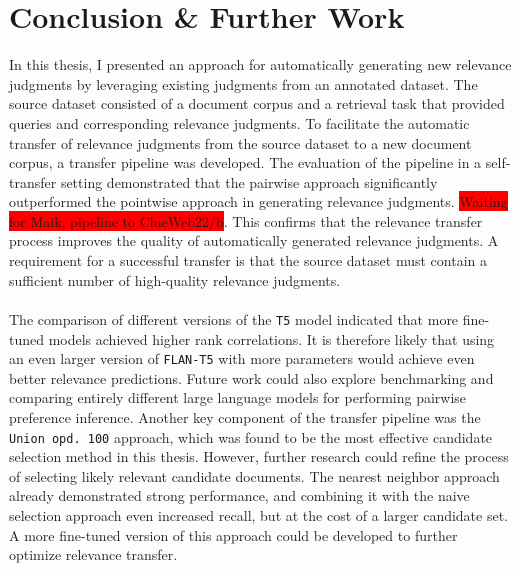 \chapter{Conclusion \& Further Work}\label{conclusion}

In this thesis, I presented an approach for automatically generating new relevance judgments by leveraging existing judgments from an annotated dataset. The source dataset consisted of a document corpus and a retrieval task that provided queries and corresponding relevance judgments. To facilitate the automatic transfer of relevance judgments from the source dataset to a new document corpus, a transfer pipeline was developed. The evaluation of the pipeline in a self-transfer setting demonstrated that the pairwise approach significantly outperformed the pointwise approach in generating relevance judgments. \colorbox{red}{Waiting for Maik, pipeline to ClueWeb22/b}. This confirms that the relevance transfer process improves the quality of automatically generated relevance judgments. A  requirement for a successful transfer is that the source dataset must contain a sufficient number of high-quality relevance judgments.
\\\\
The comparison of different versions of the \texttt{T5} model indicated that more fine-tuned models achieved higher rank correlations. It is therefore likely that using an even larger version of \texttt{FLAN-T5} with more parameters would achieve even better relevance predictions. Future work could also explore benchmarking and comparing entirely different large language models for performing pairwise preference inference. Another key component of the transfer pipeline was the \texttt{Union opd.\ 100} approach, which was found to be the most effective candidate selection method in this thesis. However, further research could refine the process of selecting likely relevant candidate documents. The nearest neighbor approach already demonstrated strong performance, and combining it with the naive selection approach even increased recall, but at the cost of a larger candidate set. A more fine-tuned version of this approach could be developed to further optimize relevance transfer.


